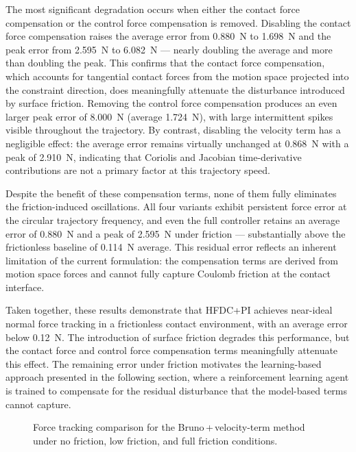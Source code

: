 \documentclass[
	german,%
	accentcolor=9c,%
	ruledheaders=section,%
	class=report,%
	thesis={type=bachelor},%
	fontsize=11pt,%
	parskip=half-,%
	custommargins=true,%
	marginpar=false,%
]{tudapub}
\begin{document}
The most significant degradation occurs when either the contact force compensation or the control force compensation is removed. Disabling the contact force compensation raises the average error from 0.880~N to 1.698~N and the peak error from 2.595~N to 6.082~N — nearly doubling the average and more than doubling the peak. This confirms that the contact force compensation, which accounts for tangential contact forces from the motion space projected into the constraint direction, does meaningfully attenuate the disturbance introduced by surface friction. Removing the control force compensation produces an even larger peak error of 8.000~N (average 1.724~N), with large intermittent spikes visible throughout the trajectory. By contrast, disabling the velocity term has a negligible effect: the average error remains virtually unchanged at 0.868~N with a peak of 2.910~N, indicating that Coriolis and Jacobian time-derivative contributions are not a primary factor at this trajectory speed.

Despite the benefit of these compensation terms, none of them fully eliminates the friction-induced oscillations. All four variants exhibit persistent force error at the circular trajectory frequency, and even the full controller retains an average error of 0.880~N and a peak of 2.595~N under friction — substantially above the frictionless baseline of 0.114~N average. This residual error reflects an inherent limitation of the current formulation: the compensation terms are derived from motion space forces and cannot fully capture Coulomb friction at the contact interface.

Taken together, these results demonstrate that HFDC+PI achieves near-ideal normal force tracking in a frictionless contact environment, with an average error below 0.12~N. The introduction of surface friction degrades this performance, but the contact force and control force compensation terms meaningfully attenuate this effect. The remaining error under friction motivates the learning-based approach presented in the following section, where a reinforcement learning agent is trained to compensate for the residual disturbance that the model-based terms cannot capture.





\begin{figure}[htbp]
    \centering
    \caption{Force tracking comparison for the Bruno\,+\,velocity-term method
             under no friction, low friction, and full friction conditions.}
    \label{fig:friction_comparison}
\end{figure}
\end{document}
